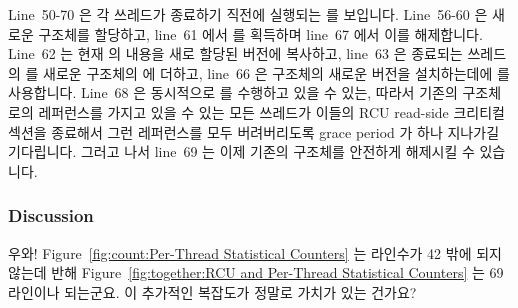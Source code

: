Line~50-70 은 각 쓰레드가 종료하기 직전에 실행되는
 를 보입니다.
Line~56-60 은 새로운  구조체를 할당하고, line~61 에서
 를 획득하며 line~67 에서 이를 해제합니다.
Line~62 는 현재  의 내용을 새로 할당된 버전에 복사하고, line~63
은 종료되는 쓰레드의  를 새로운 구조체의  에 더하고,
line~66 은  구조체의 새로운 버전을 설치하는데에
 를 사용합니다.
Line~68 은 동시적으로  를 수행하고 있을 수 있는, 따라서 기존의
 구조체로의 레퍼런스를 가지고 있을 수 있는 모든 쓰레드가 이들의
RCU read-side 크리티컬 섹션을 종료해서 그런 레퍼런스를 모두 버려버리도록 grace
period 가 하나 지나가길 기다립니다.
그러고 나서 line~69 는 이제 기존의  구조체를 안전하게 해제시킬
수 있습니다.
\iffalse

Lines~50-70 shows \co{count_unregister_thread()}, which is invoked
by each thread just before it exits.
Lines~56-60 allocate a new \co{countarray} structure,
line~61 acquires \co{final_mutex} and line~67 releases it.
Line~62 copies the contents of the current \co{countarray} into
the newly allocated version, line~63 adds the exiting thread's \co{counter}
to new structure's \co{->total}, and line~64 \co{NULL}s the exiting thread's
\co{counterp[]} array element.
Line~65 then retains a pointer to the current (soon to be old)
\co{countarray} structure, and line~66 uses \co{rcu_assign_pointer()}
to install the new version of the \co{countarray} structure.
Line~68 waits for a grace period to elapse, so that any threads that
might be concurrently executing in \co{read_count()}, and thus might
have references to the old \co{countarray} structure, will be allowed
to exit their RCU read-side critical sections, thus dropping any such
references.
Line~69 can then safely free the old \co{countarray} structure.
\fi

\subsubsection{Discussion}

\QuickQuiz{}
	우와!
	Figure~\ref{fig:count:Per-Thread Statistical Counters} 는 라인수가 42
	밖에 되지 않는데 반해 Figure~\ref{fig:together:RCU and Per-Thread
	Statistical Counters} 는 69 라인이나 되는군요.
	이 추가적인 복잡도가 정말로 가치가 있는 건가요?
	\iffalse

